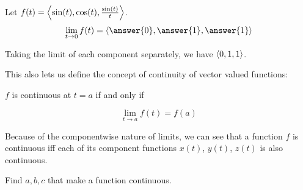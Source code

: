 \documentclass{ximera}
\begin{document}
\begin{question}
  Let $f(t) = \left\langle \sin(t),\cos(t),\frac{\sin(t)}{t}\right\rangle$.  
  \[
  \lim_{t \to 0} f(t) = \vector{\answer{0},\answer{1},\answer{1}}
  \]
  \begin{hint}
    Taking the limit of each component separately, we have $\left\langle 0,1,1\right\rangle$.
  \end{hint}
\end{question}


This also lets us define the concept of continuity of vector valued functions: 

\begin{definition}
 $f$ is continuous at $t= a$ if and only if
 
 \[
 \lim_{t \to a} f(t)  = f(a)
 \]
 \end{definition}


Because of the componentwise nature of limits, we can see that a
function $f$ is continuous iff each of its component functions $x(t)$,
$y(t)$, $z(t)$ is also continuous.


Find $a,b,c$ that make a function continuous. 
\end{document}
